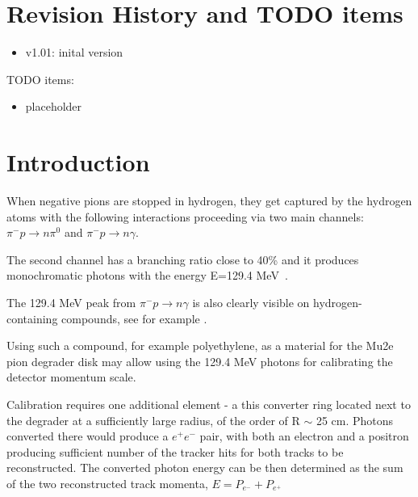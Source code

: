 \documentclass[12pt]{article}
\begin{document}
% 


\newpage
\section {Revision History and TODO items}

\begin{itemize}
\item
  v1.01: inital version
\end{itemize}

TODO items:

\begin{itemize}
\item
  placeholder
\end{itemize}

\newpage
\section {Introduction}
When negative pions are stopped in hydrogen, they get captured by the hydrogen atoms
with the following interactions proceeding via two main channels:
$\pi^- p \to n\pi^0$ and $\pi^- p \to n \gamma$.

The second channel has a branching ratio close to 40\% and it produces monochromatic
photons with the energy E=129.4 MeV~\cite{something_on_RPC}.

The 129.4 MeV peak from $\pi^- p \to n \gamma$ is also clearly visible on hydrogen-containing
compounds, see for example \cite{}.

Using such a compound, for example polyethylene, as a material for the Mu2e pion degrader
disk may allow using the 129.4 MeV photons for calibrating the detector momentum scale.

Calibration requires one additional element - a this converter ring located next to the degrader
at a sufficiently large radius, of the order of R $\sim$ 25 cm. Photons converted there would
produce a $e^+e^-$ pair, with both an electron and a positron producing sufficient number of
the tracker hits for both tracks to be reconstructed. 
The converted photon energy can be then determined as the sum of the two reconstructed
track momenta, $E = P_{e^-} + P_{e^+}$ 
\end{document}
